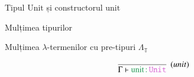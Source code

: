 \documentclass[xcolor=pdftex,romanian,colorlinks]{beamer}
\begin{document}
%
%
%
%
%

\begin{frame}{Tipul $\mathrm{Unit}$ și constructorul $\mathrm{unit}$}

Mulțimea  \alert{tipurilor}  
\begin{center}
 \end{center}

\vspace{.3cm}
Mulțimea \alert{$\lambda$-termenilor cu pre-tipuri $\Lambda_\mathbb{T}$} 
\begin{center}
\end{center}

\[
\infer[(unit)]
	{\Gamma \vdash \type{\unit}{\UnitT}}
	 {}
\]


\end{frame}
\end{document}
